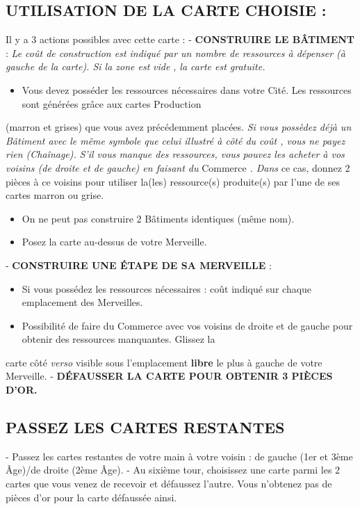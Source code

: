 \documentclass{article}%
\begin{document}
\subsection{ UTILISATION DE LA CARTE CHOISIE :
}%
\label{subsec:UTILISATIONDELACARTECHOISIE}%
Il y a 3 actions possibles avec cette carte :
%
{-} %
\textbf{CONSTRUIRE LE BÂTIMENT}%
\textit{ }%
 :
%
\textit{ Le coût de construction est indiqué par un nombre de ressources à dépenser (à gauche de la carte). Si la zone est }%
\textit{vide}%
\textit{, la carte est gratuite.
}%
\begin{itemize}%
\item%
%
 Vous devez posséder les ressources nécessaires dans votre Cité. Les ressources sont générées grâce aux cartes Production
%
\end{itemize}%
(marron et grises) que vous avez précédemment placées.
%
\textit{ Si vous possèdez déjà un Bâtiment avec le même }%
\textit{symbole}%
\textit{ que celui illustré à côté du coût , vous ne payez rien (Chaînage).
}%
\textit{ S'il vous manque des ressources, vous pouvez les acheter à vos voisins (de droite et de gauche) en faisant du }%
Commerce%
\textit{. Dans
}%
ce cas, donnez 2 pièces à ce voisins pour utiliser la(les) ressource(s) produite(s) par l'une de ses cartes marron ou grise.
%
\begin{itemize}%
\item%
%
 On ne peut pas construire 2 Bâtiments identiques (même nom).
%
\item%
%
 Posez la carte au{-}dessus de votre Merveille.
%
\end{itemize}%
{-} %
\textbf{CONSTRUIRE UNE ÉTAPE DE SA MERVEILLE}%
\textit{ }%
 :
%
\begin{itemize}%
\item%
%
 Si vous possédez les ressources nécessaires : coût indiqué sur chaque emplacement des Merveilles.
%
\item%
%
 Possibilité de faire du Commerce avec vos voisins de droite et de gauche pour obtenir des ressources manquantes. Glissez la
%
\end{itemize}%
carte côté %
\textit{verso}%
\textit{ }%
 visible sous l’emplacement %
\textbf{libre}%
\textit{ }%
 le plus à gauche de votre Merveille.
%
{-} %
\textbf{DÉFAUSSER LA CARTE POUR OBTENIR 3 PIÈCES D’OR.}%



%
\subsection{ PASSEZ LES CARTES RESTANTES
}%
\label{subsec:PASSEZLESCARTESRESTANTES}%
{-} Passez les cartes restantes de votre main à votre voisin : de gauche (1er et 3ème Âge)/de droite (2ème Âge).
%
{-} Au sixième tour, choisissez une carte parmi les 2 cartes que vous venez de recevoir et défaussez l'autre. Vous n'obtenez pas de
%
pièces d'or pour la carte défaussée ainsi.
\end{document}
